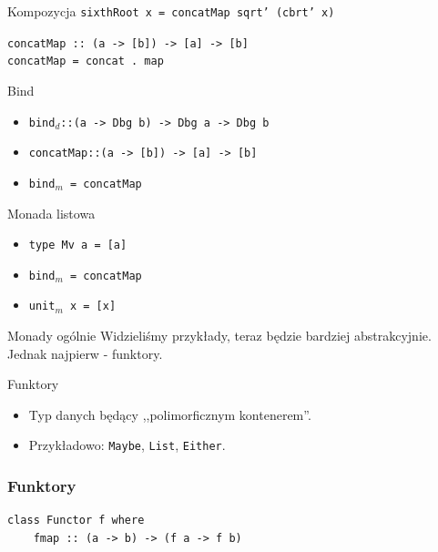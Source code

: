 \documentclass[14pt]{beamer}
\begin{document}
\begin{frame}{Kompozycja}
    \texttt{sixthRoot x = concatMap sqrt' (cbrt' x)}

    \texttt{concatMap :: (a -> [b]) -> [a] -> [b]\\
    concatMap = concat . map}
\end{frame}

\begin{frame}{Bind}
    \begin{itemize}
        \item \texttt{bind$_d$::(a -> Dbg b) -> Dbg a -> Dbg b}
        \item \texttt{concatMap::(a -> [b]) -> [a] -> [b]}
        \item \texttt{bind$_m$ = concatMap}
    \end{itemize}
\end{frame}

\begin{frame}{Monada listowa}
    \begin{itemize}
        \item \texttt{type Mv a = [a]}
        \item \texttt{bind$_m$ = concatMap}
        \item \texttt{unit$_m$ x = [x]}
    \end{itemize}
\end{frame}


\begin{frame}{Monady ogólnie}
    Widzieliśmy przykłady, teraz będzie bardziej abstrakcyjnie.
    Jednak najpierw - funktory.
\end{frame}

\begin{frame}{Funktory}
    \begin{itemize}
        \item Typ danych będący ,,polimorficznym kontenerem''.
        \item Przykładowo: \texttt{Maybe}, \texttt{List}, \texttt{Either}.
    \end{itemize}
\end{frame}

\begin{frame}[fragile]
\frametitle{Funktory}
\begin{verbatim}
class Functor f where
    fmap :: (a -> b) -> (f a -> f b)
\end{verbatim}
\end{frame}
\end{document}

